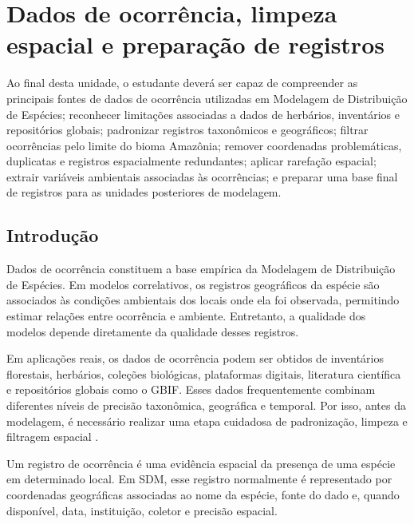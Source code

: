 \chapter[Dados de ocorrência]{Dados de ocorrência, limpeza espacial e preparação de registros}

\begin{objetivos}
	Ao final desta unidade, o estudante deverá ser capaz de compreender as principais fontes de dados de ocorrência utilizadas em Modelagem de Distribuição de Espécies; reconhecer limitações associadas a dados de herbários, inventários e repositórios globais; padronizar registros taxonômicos e geográficos; filtrar ocorrências pelo limite do bioma Amazônia; remover coordenadas problemáticas, duplicatas e registros espacialmente redundantes; aplicar rarefação espacial; extrair variáveis ambientais associadas às ocorrências; e preparar uma base final de registros para as unidades posteriores de modelagem.
\end{objetivos}

\section{Introdução}

Dados de ocorrência constituem a base empírica da Modelagem de Distribuição de Espécies. Em modelos correlativos, os registros geográficos da espécie são associados às condições ambientais dos locais onde ela foi observada, permitindo estimar relações entre ocorrência e ambiente. Entretanto, a qualidade dos modelos depende diretamente da qualidade desses registros.

Em aplicações reais, os dados de ocorrência podem ser obtidos de inventários florestais, herbários, coleções biológicas, plataformas digitais, literatura científica e repositórios globais como o GBIF. Esses dados frequentemente combinam diferentes níveis de precisão taxonômica, geográfica e temporal. Por isso, antes da modelagem, é necessário realizar uma etapa cuidadosa de padronização, limpeza e filtragem espacial \parencite{guisan2017habitat,hijmans2021species,zizka2019coordinatecleaner}.

\begin{conceito}[title={\faBook\quad Registro de ocorrência}]
	Um registro de ocorrência é uma evidência espacial da presença de uma espécie em determinado local. Em SDM, esse registro normalmente é representado por coordenadas geográficas associadas ao nome da espécie, fonte do dado e, quando disponível, data, instituição, coletor e precisão espacial.
\end{conceito}

